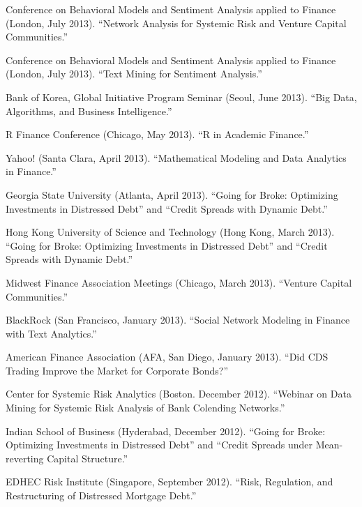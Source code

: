 \documentclass{article}
\begin{document}
\begin{etaremune}
{\item Conference on Behavioral Models and Sentiment Analysis applied to Finance (London, July 2013). ``Network Analysis for Systemic Risk and Venture Capital Communities.'' 

\item Conference on Behavioral Models and Sentiment Analysis applied to Finance (London, July 2013). ``Text Mining for Sentiment Analysis.'' 

\item Bank of Korea, Global Initiative Program Seminar (Seoul, June 2013). ``Big Data, Algorithms, and Business Intelligence.''

\item R Finance Conference (Chicago, May 2013). ``R in Academic Finance.''

\item Yahoo! (Santa Clara, April 2013). ``Mathematical Modeling and Data Analytics in Finance.''

\item Georgia State University (Atlanta, April 2013). ``Going for Broke: Optimizing Investments in Distressed Debt'' and ``Credit Spreads with Dynamic Debt.''

\item Hong Kong University of Science and Technology (Hong Kong, March 2013). ``Going for Broke: Optimizing Investments in Distressed Debt'' and ``Credit Spreads with Dynamic Debt.''


\item Midwest Finance Association Meetings (Chicago, March 2013). ``Venture Capital Communities.''

\item BlackRock (San Francisco, January 2013). ``Social Network Modeling in Finance with Text Analytics.''

\item American Finance Association (AFA, San Diego, January 2013). ``Did CDS Trading Improve the Market for Corporate Bonds?''

\item Center for Systemic Risk Analytics (Boston. December 2012). ``Webinar on Data Mining for Systemic Risk Analysis of Bank Colending Networks.''

\item Indian School of Business (Hyderabad, December 2012). 
``Going for Broke: Optimizing Investments in Distressed Debt'' and ``Credit Spreads under Mean-reverting Capital Structure.''

\item EDHEC Risk Institute (Singapore, September 2012). ``Risk, Regulation, and Restructuring of Distressed Mortgage Debt.'' 

}
\end{etaremune}
\end{document}
